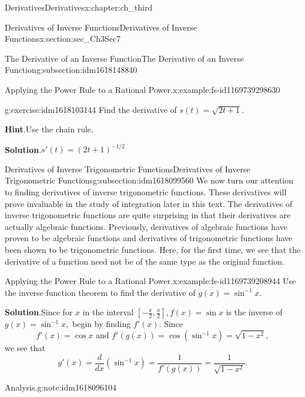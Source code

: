 \documentclass[oneside,10pt,]{book}
\newcommand{\blocktitlefont}{\relax}
\numberwithin{equation}{section}
\begin{document}
\begin{chapterptx}{Derivatives}{}{Derivatives}{}{}{x:chapter:ch_third}
\begin{sectionptx}{Derivatives of Inverse Functions}{}{Derivatives of Inverse Functions}{}{}{x:section:sec_Ch3Sec7}
\begin{subsectionptx}{The Derivative of an Inverse Function}{}{The Derivative of an Inverse Function}{}{}{g:subsection:idm1618148840}
\begin{example}{Applying the Power Rule to a Rational Power.}{x:example:fs-id1169739298630}
\begin{equation*}
\end{equation*}
\end{example}
\begin{inlineexercise}{}{g:exercise:idm1618103144}%
Find the derivative of \(s(t)=\sqrt{2t+1}.\)%
\par\smallskip%
\noindent\textbf{\blocktitlefont Hint}.\hypertarget{g:hint:idm1618104936}{}\quad{}Use the chain rule.%
\par\smallskip%
\noindent\textbf{\blocktitlefont Solution}.\hypertarget{g:solution:idm1618100328}{}\quad{}\(s'(t)=(2t+1)^{-1/2}\)%
\end{inlineexercise}%
\end{subsectionptx}
%
%
\typeout{************************************************}
\typeout{************************************************}
%
\begin{subsectionptx}{Derivatives of Inverse Trigonometric Functions}{}{Derivatives of Inverse Trigonometric Functions}{}{}{g:subsection:idm1618099560}
We now turn our attention to finding derivatives of inverse trigonometric functions. These derivatives will prove invaluable in the study of integration later in this text. The derivatives of inverse trigonometric functions are quite surprising in that their derivatives are actually algebraic functions. Previously, derivatives of algebraic functions have proven to be algebraic functions and derivatives of trigonometric functions have been shown to be trigonometric functions. Here, for the first time, we see that the derivative of a function need not be of the same type as the original function.%
\begin{example}{Applying the Power Rule to a Rational Power.}{x:example:fs-id1169739208944}%
Use the inverse function theorem to find the derivative of \(g(x)=\sin^{-1}x.\)%
\par\smallskip%
\noindent\textbf{\blocktitlefont Solution}.\hypertarget{g:solution:idm1618101864}{}\quad{}Since for \(x\) in the interval \([-\frac{\pi}{2},\frac{\pi}{2}],f(x)=\sin x\) is the inverse of \(g(x)=\sin^{-1}x,\) begin by finding \(f'(x).\) Since%
%
\begin{equation*}
f'(x)=\cos  x \text{ and } f'(g(x))=\cos  (\sin^{-1}x)=\sqrt{1-x^2},
\end{equation*}
we see that%
%
\begin{equation*}
g'(x)=\frac{d}{dx}(\sin^{-1}x)=\frac{1}{f'(g(x))}=\frac{1}{\sqrt{1-x^2}}.
\end{equation*}
\begin{note}{Analysis.}{g:note:idm1618096104}%

\end{note}
\end{example}
\end{subsectionptx}
\end{sectionptx}
\end{chapterptx}
\end{document}
